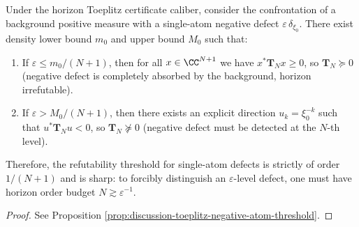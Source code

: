 \begin{conclusion}\label{con:xi-terminal-toeplitz-negative-atom-threshold-sharp}
Under the horizon Toeplitz certificate caliber, consider the confrontation of a background positive measure with a single-atom negative defect \(\varepsilon\,\delta_{\xi_0}\).
There exist density lower bound \(m_0\) and upper bound \(M_0\) such that:
\begin{enumerate}
  \item If \(\varepsilon\le m_0/(N+1)\), then for all \(x\in\CC^{N+1}\) we have \(x^\ast \mathbf{T}_N x\ge 0\), so \(\mathbf{T}_N\succeq 0\) (negative defect is completely absorbed by the background, horizon irrefutable).
  \item If \(\varepsilon> M_0/(N+1)\), then there exists an explicit direction \(u_k=\xi_0^{-k}\) such that \(u^\ast\mathbf{T}_N u<0\), so \(\mathbf{T}_N\not\succeq 0\) (negative defect must be detected at the \(N\)-th level).
\end{enumerate}
Therefore, the refutability threshold for single-atom defects is strictly of order \(1/(N+1)\) and is sharp: to forcibly distinguish an \(\varepsilon\)-level defect, one must have horizon order budget \(N\gtrsim \varepsilon^{-1}\).
\end{conclusion}
\begin{proof}
See Proposition \ref{prop:discussion-toeplitz-negative-atom-threshold}.
\end{proof}



